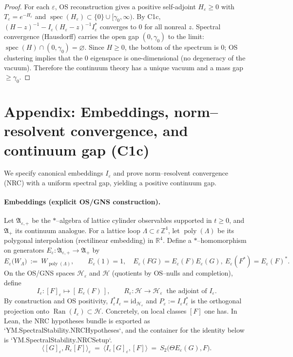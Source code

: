 \documentclass[11pt]{amsart}
\theoremstyle{plain}
\theoremstyle{definition}
\theoremstyle{remark}
\begin{document}
\begin{proof}
For each $\varepsilon$, OS reconstruction gives a positive self-adjoint $H_{\varepsilon}\ge 0$ with $T_{\varepsilon}=e^{-H_{\varepsilon}}$ and $\operatorname{spec}(H_{\varepsilon})\subset\{0\}\cup[\gamma_0,\infty)$. By C1c, $(H-z)^{-1}-I_{\varepsilon}(H_{\varepsilon}-z)^{-1}I_{\varepsilon}^*$ converges to $0$ for all nonreal $z$. Spectral convergence (Hausdorff) carries the open gap $(0,\gamma_0)$ to the limit: $\operatorname{spec}(H)\cap(0,\gamma_0)=\varnothing$. Since $H\ge 0$, the bottom of the spectrum is $0$; OS clustering implies that the $0$ eigenspace is one-dimensional (no degeneracy of the vacuum). Therefore the continuum theory has a unique vacuum and a mass gap $\ge \gamma_0$.
\end{proof}

\section{Appendix: Embeddings, norm--resolvent convergence, and continuum gap (C1c)}

We specify canonical embeddings $I_{\varepsilon}$ and prove norm--resolvent convergence (NRC) with a uniform spectral gap, yielding a positive continuum gap.

\paragraph{Embeddings (explicit OS/GNS construction).}
Let $\mathfrak A_{\varepsilon,+}$ be the $*$–algebra of lattice cylinder observables supported in $t\ge 0$, and $\mathfrak A_+$ its continuum analogue. For a lattice loop $\Lambda\subset\varepsilon\,\mathbb{Z}^4$, let $\operatorname{poly}(\Lambda)$ be its polygonal interpolation (rectilinear embedding) in $\mathbb R^4$. Define a $*$–homomorphism on generators $E_{\varepsilon}:\mathfrak A_{\varepsilon,+}\to\mathfrak A_+$ by
\[
  E_{\varepsilon}\bigl(W_{\Lambda}\bigr)\ :=\ W_{\operatorname{poly}(\Lambda)},\qquad E_{\varepsilon}(1)=1,\quad E_{\varepsilon}(FG)=E_{\varepsilon}(F)E_{\varepsilon}(G),\ E_{\varepsilon}(F^*)=E_{\varepsilon}(F)^*.
\]
On the OS/GNS spaces $\mathcal H_{\varepsilon}$ and $\mathcal H$ (quotients by OS–nulls and completion), define
\[
  I_{\varepsilon}:[F]_{\varepsilon}\mapsto [\,E_{\varepsilon}(F)\,],\qquad R_{\varepsilon}:\mathcal H\to\mathcal H_{\varepsilon}\ \text{ the adjoint of }I_{\varepsilon}.
\]
By construction and OS positivity, $I_{\varepsilon}^*I_{\varepsilon}=\mathrm{id}_{\mathcal H_{\varepsilon}}$ and $P_{\varepsilon}:=I_{\varepsilon}I_{\varepsilon}^*$ is the orthogonal projection onto $\operatorname{Ran}(I_{\varepsilon})\subset\mathcal H$. Concretely, on local classes $[F]$ one has. In Lean, the NRC hypotheses bundle is exported as `YM.SpectralStability.NRCHypotheses`, and the container for the identity below is `YM.SpectralStability.NRCSetup`.
\[
  \langle [G]_{\varepsilon}, R_{\varepsilon}[F]\rangle_{\varepsilon}\ =\ \langle I_{\varepsilon}[G]_{\varepsilon}, [F]\rangle\ =\ S_2\bigl(\Theta E_{\varepsilon}(G), F\bigr).
\]
\end{document}
